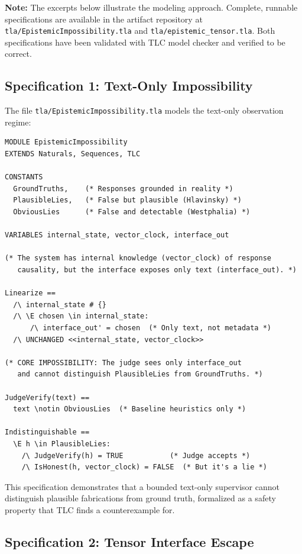 \documentclass[12pt]{article}
\begin{document}
\textbf{Note:} The excerpts below illustrate the modeling approach. Complete, runnable specifications are available in the artifact repository at \texttt{tla/EpistemicImpossibility.tla} and \texttt{tla/epistemic\_tensor.tla}. Both specifications have been validated with TLC model checker and verified to be correct.

\subsection{Specification 1: Text-Only Impossibility}

The file \texttt{tla/EpistemicImpossibility.tla} models the text-only observation regime:

\begin{verbatim}
MODULE EpistemicImpossibility
EXTENDS Naturals, Sequences, TLC

CONSTANTS
  GroundTruths,    (* Responses grounded in reality *)
  PlausibleLies,   (* False but plausible (Hlavinsky) *)
  ObviousLies      (* False and detectable (Westphalia) *)

VARIABLES internal_state, vector_clock, interface_out

(* The system has internal knowledge (vector_clock) of response
   causality, but the interface exposes only text (interface_out). *)

Linearize ==
  /\ internal_state # {}
  /\ \E chosen \in internal_state:
      /\ interface_out' = chosen  (* Only text, not metadata *)
  /\ UNCHANGED <<internal_state, vector_clock>>

(* CORE IMPOSSIBILITY: The judge sees only interface_out
   and cannot distinguish PlausibleLies from GroundTruths. *)

JudgeVerify(text) ==
  text \notin ObviousLies  (* Baseline heuristics only *)

Indistinguishable ==
  \E h \in PlausibleLies:
    /\ JudgeVerify(h) = TRUE           (* Judge accepts *)
    /\ IsHonest(h, vector_clock) = FALSE  (* But it's a lie *)
\end{verbatim}

This specification demonstrates that a bounded text-only supervisor cannot distinguish plausible fabrications from ground truth, formalized as a safety property that TLC finds a counterexample for.

\subsection{Specification 2: Tensor Interface Escape}
\end{document}
